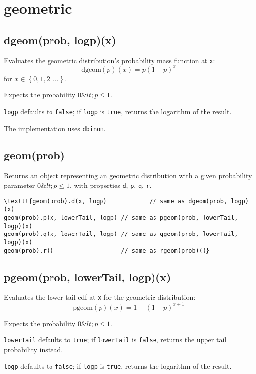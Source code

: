 \documentclass{article}
\begin{document}
  \section{geometric}
    \subsection*{dgeom(prob, logp)(x)}
    Evaluates the geometric distribution's probability mass function at \texttt{x}:
$$\textrm{dgeom}(p)(x) = p(1-p)^x$$
for $x \in\left\{0,1,2,\ldots\right\}$.


Expects the probability $0 \&lt; p\leq 1$.


\texttt{logp} defaults to \texttt{false}; if \texttt{logp} is \texttt{true}, returns the
logarithm of the result.


The implementation uses \texttt{dbinom}.


    \subsection*{geom(prob)}
    Returns an object representing an geometric distribution with a
given probability parameter $0 \&lt; p \leq 1$,
with properties \texttt{d}, \texttt{p}, \texttt{q}, \texttt{r}.


\begin{lstlisting}
\texttt{geom(prob).d(x, logp)            // same as dgeom(prob, logp)(x)
geom(prob).p(x, lowerTail, logp) // same as pgeom(prob, lowerTail, logp)(x)
geom(prob).q(x, lowerTail, logp) // same as qgeom(prob, lowerTail, logp)(x)
geom(prob).r()                   // same as rgeom(prob)()}\end{lstlisting}

    \subsection*{pgeom(prob, lowerTail, logp)(x)}
    Evaluates the lower-tail cdf at \texttt{x} for the geometric distribution:
$$\textrm{pgeom}(p)(x) = 1 - (1-p)^{x+1}$$


Expects the probability $0 \&lt; p \leq 1$.


\texttt{lowerTail} defaults to \texttt{true}; if \texttt{lowerTail} is \texttt{false}, returns
the upper tail probability instead.


\texttt{logp} defaults to \texttt{false}; if \texttt{logp} is \texttt{true}, returns the logarithm
of the result.
\end{document}

